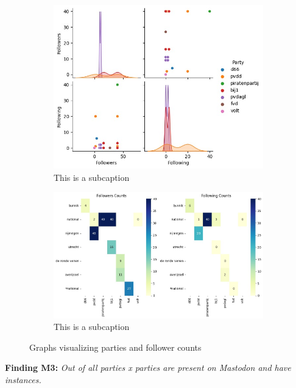 \begin{figure}[ht]
  \centering
  \begin{subfigure}[h]{.49\linewidth}
    \includegraphics[width=\textwidth]{media/parties-following-counts.jpeg}
    \captionsetup{justification=centering}
    \caption{This is a subcaption}
    \label{fig:partyfollowers}
  \end{subfigure}
  \begin{subfigure}[h]{.49\linewidth}
      \captionsetup{justification=centering}
      \includegraphics[width=\textwidth]{media/parties-following-region-counts.jpeg}
      \caption{This is a subcaption}
      \label{fig:partyfollowingregions}
  \end{subfigure}
  \caption{Graphs visualizing parties and follower counts}
  \label{fig:partyfollowerstotal}
\end{figure}


\textbf{Finding M3:} \textit{Out of all parties x parties are present on Mastodon and have instances.}
